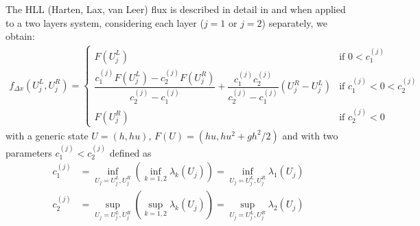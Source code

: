 The HLL (Harten, Lax, van Leer) flux is described in detail in \cite{HLL, Toro} and when applied to a two layers system, considering each layer ($j=1$ or $j=2$) separately, we obtain:
\begin{align*}
    f_{\Delta x}(U_j^L,U_j^R) = \begin{cases}
        F(U_j^L) &\text{if $0 < c_1^{(j)}$}\\
        \dfrac{c_1^{(j)} F(U_j^L) - c_2^{(j)} F(U_j^R)}{c_2^{(j)} - c_1^{(j)}}+ \dfrac{c_1^{(j)} c_2^{(j)}}{c_2^{(j)}-c_1^{(j)}}(U_j^R-U_j^L) &\text{if $c_1^{(j)} < 0 < c_2^{(j)}$}\\
        F(U_j^R) &\text{if $c_2^{(j)} < 0$}
    \end{cases}
\end{align*}
with a generic state $U = (h,hu)$, $F(U) = (hu, hu^2 + gh^2/2)$ and with two parameters $c_1^{(j)} < c_2^{(j)} $ defined as
\begin{subequations}
    \label{eq:c1c2repro}
\begin{align}
    c_1^{(j)} &= \inf_{U_j = U_j^L, U_j^R} \left( \inf_{k = {1,2}} \lambda_k(U_j)\right)  = \inf_{U_j = U_j^L, U_j^R} \lambda_1(U_j) \label{eq:c1repro} \\
    c_2^{(j)} &= \sup_{U_j = U_j^L, U_j^R} \left( \sup_{k = {1,2}} \lambda_k(U_j)\right) = \sup_{U_j = U_j^L, U_j^R} \lambda_2(U_j) \label{eq:c2repro}
\end{align}
\end{subequations}
